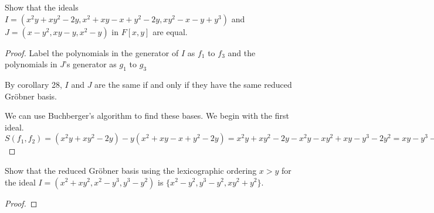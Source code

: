 \documentclass[10pt]{article}
\newenvironment{problem}[2][Problem]{\begin{trivlist}
		\item[\hskip \labelsep {\bfseries #1}\hskip \labelsep {\bfseries #2.}]}{\end{trivlist}}
\begin{document}
	\begin{problem}{6.23}
		Show that the ideals $I = (x^2y + xy^2 - 2y, x^2 + xy - x + y^2 - 2y , xy^2 - x - y + y^3 )$ and
		$J = (x - y^2 , xy - y, x^2 - y)$ in $F[x,y]$ are equal.
		\begin{proof}
			Label the polynomials in the generator of $I$ as $f_1$ to $f_3$ and the polynomials in $J$'s generator as $g_1$ to $g_3$
			
			By corollary 28, $I$ and $J$ are the same if and only if they have the same reduced Gr\"obner basis. 
			
			We can use Buchberger's algorithm to find these bases.
			We begin with the first ideal. $S(f_1, f_2) = 
			(x^2y + xy^2-2y) - y(x^2 + xy - x + y^2 - 2y) = 
			x^2y + xy^2 - 2y - x^2y -xy^2 + xy - y^3 - 2y^2 =
			xy - y^3 - 2y^2 - 2y$
				
		\end{proof}
	\end{problem}
	
	\begin{problem}{6.25}
		Show that the reduced Gr\"obner basis using the lexicographic ordering $x > y$ for the ideal $I = (x^2 + xy^2, x^2 - y^3, y^3 - y^2)$ is $\{x^2 - y^2, y^3 - y^2, xy^2 + y^2\}$.
		\begin{proof}
			
		\end{proof}
	\end{problem}
	
	\begin{problem}{6.27}
		
	\end{problem}
\end{document}
